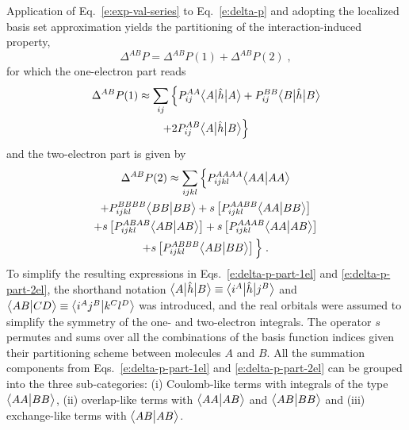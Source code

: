 Application of Eq.~\eqref{e:exp-val-series}
to Eq.~\eqref{e:delta-p} and adopting the localized basis set approximation
yields the partitioning of the interaction\hyp{}induced property,
%
\begin{equation} \label{e:delta-p-part}
 \Delta^{AB} P = \Delta^{AB} P(1) + \Delta^{AB} P(2) \;,
\end{equation}
%
for which the one\hyp{}electron part reads
%
\begin{multline} \label{e:delta-p-part-1el}
 \Delta^{AB} P(1) \approx
	\sum_{ij} \Big\{ 
	P^{AA}_{ij}  \tBraKet{A}{\hat{h}}{A} +    %
	P^{BB}_{ij}  \tBraKet{B}{\hat{h}}{B} \\ + %
2	P^{AB}_{ij}  \tBraKet{A}{\hat{h}}{B}      %
	\Big\}
\end{multline}
%
and the two\hyp{}electron part is given by
%
\begin{multline} \label{e:delta-p-part-2el}
 \Delta^{AB} P(2) \approx
	\sum_{ijkl} \Big\{ 
	P^{AAAA}_{ijkl} \BraKet{AA}{AA} \\ +    %
	P^{BBBB}_{ijkl} \BraKet{BB}{BB} +  %
	{s} \left[ P^{AABB}_{ijkl} \BraKet{AA}{BB} \right] \\ + 
	{s} \left[ P^{ABAB}_{ijkl} \BraKet{AB}{AB} \right] + 
	{s} \left[ P^{AAAB}_{ijkl} \BraKet{AA}{AB} \right] \\ +
	{s} \left[ P^{ABBB}_{ijkl} \BraKet{AB}{BB} \right]
	\Big\} \;.
\end{multline}
%
To simplify the resulting expressions
in Eqs.~\eqref{e:delta-p-part-1el} and \eqref{e:delta-p-part-2el},
the shorthand notation $\bigl\langle {A} \bigl\lvert {\hat{h}} \bigl\lvert {B} \bigr\rangle \equiv \bigl\langle {i^A} \bigl\lvert {\hat{h}} \bigl\lvert {j^B} \bigr\rangle$ and 
$\bigl\langle {AB} \bigl\lvert {CD} \bigr\rangle \equiv \bigl\langle {i^Aj^B} \bigl\lvert {k^Cl^D} \bigr\rangle$
was introduced, and
the real orbitals 
were assumed to simplify the symmetry of the one\hyp{} and two\hyp{}electron integrals.
The operator $s$ permutes and sums over all the combinations of the basis function indices
given their partitioning scheme between molecules $A$ and $B$.
All the summation components from Eqs.~\eqref{e:delta-p-part-1el} and \eqref{e:delta-p-part-2el} 
can be grouped into the three
sub\hyp{}categories: (i) Coulomb\hyp{}like terms
with integrals of the type $\bigl\langle {AA} \bigl\lvert {BB} \bigr\rangle$, (ii) overlap\hyp{}like terms with $\bigl\langle {AA} \bigl\lvert {AB} \bigr\rangle$
and $\bigl\langle {AB} \bigl\lvert {BB} \bigr\rangle$ and (iii) exchange\hyp{}like terms with $\bigl\langle {AB} \bigl\lvert {AB} \bigr\rangle$.


